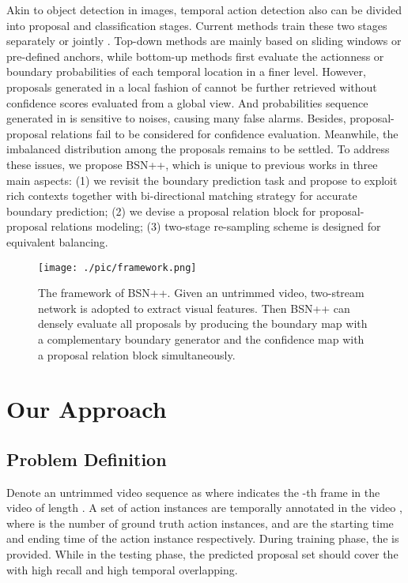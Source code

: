 \documentclass[letterpaper]{article} \usepackage{aaai21}  \usepackage{times}  \usepackage{helvet} \usepackage{courier}  \usepackage[hyphens]{url}  \usepackage{graphicx} \urlstyle{rm} \def\UrlFont{\rm}  \usepackage{natbib}  \usepackage{amsmath,amssymb} \usepackage{caption} \frenchspacing  \usepackage{color}
\begin{document}
Akin to object detection in images, temporal action detection also can be divided
into proposal and classification stages. Current methods train these two stages separately \cite{G.Singh} or jointly \cite{sstad,SSAD}. Top-down methods \cite{SSAD} are mainly based on sliding windows or pre-defined anchors, while bottom-up methods \cite{Y.Xiong,BSN,LinBMN} first evaluate the actionness or boundary probabilities of each temporal location in a finer level. 
However, proposals generated in a local fashion of \cite{Y.Xiong} cannot be further retrieved without confidence scores evaluated from a global view. And probabilities sequence generated in \cite{BSN,LinBMN,LiuMulti} is sensitive to noises, causing many false alarms. Besides, proposal-proposal relations fail to be considered for confidence evaluation. Meanwhile, the imbalanced distribution among the proposals remains to be settled. To address these issues, we propose BSN++, which is unique to previous works in three main aspects: (1) we revisit the boundary prediction task and propose to exploit rich contexts together with bi-directional matching strategy for accurate boundary prediction; (2) we devise a proposal relation block for proposal-proposal relations modeling; (3) two-stage re-sampling scheme is designed for equivalent balancing.


\begin{figure}[t]
	\centering
\texttt{[image: ./pic/framework.png]} \caption{The framework of BSN++. Given an untrimmed video, two-stream network is adopted to extract visual features. Then BSN++ can densely evaluate all proposals by producing the boundary map with a complementary boundary generator and the confidence map with a proposal relation block simultaneously.}
	\label{fig:framework}
\end{figure}



\section{Our Approach}



\subsection{Problem Definition}

Denote an untrimmed video sequence as  where  indicates the -th frame in the video of length . A set of action instances  are temporally annotated in the video , where  is the number of ground truth action instances, and  are the starting time and ending time of the action instance  respectively. During training phase, the  is provided. While in the testing phase, the predicted proposal set  should cover the  with high recall and high temporal overlapping.
\end{document}
